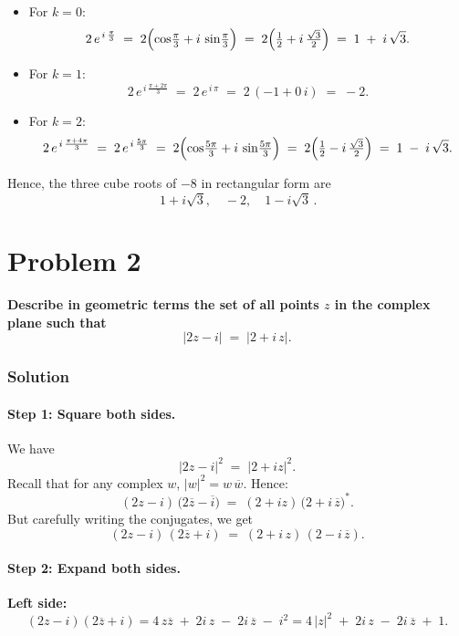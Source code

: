\documentclass[12pt]{article}
\theoremstyle{definition} %
\theoremstyle{plain} %
\begin{document}
\begin{itemize}
\item For $k=0$:
\[
2 \, e^{\,i\,\frac{\pi}{3}}
\;=\;
2\Bigl(\cos\!\tfrac{\pi}{3} + i\,\sin\!\tfrac{\pi}{3}\Bigr)
\;=\;
2\Bigl(\tfrac12 + i\,\tfrac{\sqrt{3}}{2}\Bigr)
\;=\;
1 \;+\; i\,\sqrt{3}.
\]

\item For $k=1$:
\[
2 \, e^{\,i\,\frac{\pi + 2\pi}{3}}
\;=\;
2 \, e^{\,i\,\pi}
\;=\;
2\,(-1 + 0\,i)
\;=\;
-2.
\]

\item For $k=2$:
\[
2 \, e^{\,i\,\frac{\pi + 4\pi}{3}}
\;=\;
2 \, e^{\,i\,\frac{5\pi}{3}}
\;=\;
2\Bigl(\cos\!\tfrac{5\pi}{3} + i\,\sin\!\tfrac{5\pi}{3}\Bigr)
\;=\;
2\Bigl(\tfrac12 - i\,\tfrac{\sqrt{3}}{2}\Bigr)
\;=\;
1 \;-\; i\,\sqrt{3}.
\]
\end{itemize}

Hence, the three cube roots of $-8$ in rectangular form are
\[
\boxed{\,1 + i\sqrt{3}, \quad -2, \quad 1 - i\sqrt{3}\,}.
\]

\vspace{1em}

\section*{Problem 2}
\textbf{Describe in geometric terms the set of all points $z$ in the complex plane such that}
\[
\lvert 2z - i \rvert \;=\; \lvert 2 + i\,z \rvert.
\]

\subsubsection*{Solution}

\paragraph{Step 1: Square both sides.}
We have
\[
|2z - i|^2 \;=\; |2 + i z|^2.
\]
Recall that for any complex $w$, $|w|^2 = w\,\overline{w}.$  Hence:
\[
(2z - i)\,\bigl(2\overline{z} - \overline{i}\bigr)
\;=\;
(2 + i z)\,\bigl(2 + i\,\overline{z}\bigr)^*.
\]
But carefully writing the conjugates, we get
\[
(2z - i)\,(2\overline{z} + i)
\;=\;
(2 + i\,z)\,(2 - i\,\overline{z}).
\]

\paragraph{Step 2: Expand both sides.}

\textbf{Left side:}
\[
(2z - i)(2\overline{z} + i)
= 4\,z\overline{z} \;+\; 2i\,z \;-\; 2i\,\overline{z} \;-\; i^2
= 4\,|z|^2 \;+\; 2i\,z \;-\; 2i\,\overline{z} \;+\; 1.
\]
\end{document}

